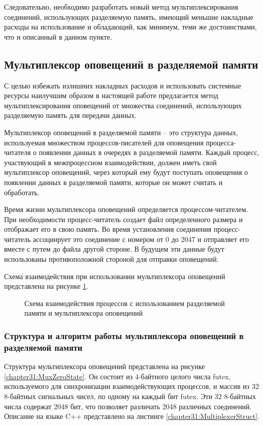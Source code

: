 Следовательно, необходимо разработать новый метод мультиплексирования соединений, использующих разделяемую память, имеющий меньшие накладные расходы на использование и обладающий, как минимум, теми же достоинствами, что и описанный в данном пункте. 

\subsection{Мультиплексор оповещений в разделяемой памяти}\label{chapter31:Mux}

С целью избежать излишних накладных расходов и использовать системные ресурсы наилучшим образом в настоящей работе предлагается метод мультиплексирования оповещений от множества соединений, использующих разделяемую память для передачи данных.

Мультиплексор оповещений в разделяемой памяти -- это структура данных, используемая множеством процессов-писателей для оповещения процесса-читателя о появлении данных в очередях в разделяемой памяти. Каждый процесс, участвующий в межпроцессном взаимодействии, должен иметь свой мультиплексор оповещений, через который ему будут поступать оповещения о появлении данных в разделяемой памяти, которые он может считать и обработать.

Время жизни мультиплексора оповещений определяется процессом-читателем. При необходимости процесс-читатель создает файл определенного размера и отображает его в свою память. Во время установления соединения процесс-читатель ассоциирует это соединение с номером от 0 до 2047 и отправляет его вместе с путем до файла другой стороне. В будущем эти данные будут использованы противоположной стороной для отправки оповещений.

Схема взаимодействия при использовании мультиплексора оповещений представлена на рисунке \ref{chapter31:FutexShmemStack}.
\begin{figure}[!h]
\caption{Схема взаимодействия процессов с использованием разделяемой памяти и мультиплексора оповещений}
\label{chapter31:FutexShmemStack}
\end{figure}

\subsubsection{Структура и алгоритм работы мультиплексора оповещений в разделяемой памяти}\label{chapter31:MuxStructure}

Структура мультиплексора оповещений представлена на рисунке \ref{chapter31:MuxZeroState}. Он состоит из 4-байтного целого числа futex, используемого для синхронизации взаимодействующих процессов, и массив из 32 8-байтных сигнальных чисел, по одному на каждый бит futex. Эти 32 8-байтных числа содержат 2048 бит, что позволяет различать 2048 различных соединений. Описание на языке C++ представлено на листинге \ref{chapter31:MultiplexerStruct}.


